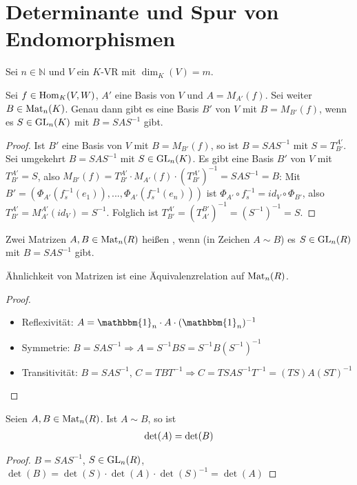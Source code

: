 \section{Determinante und Spur von Endomorphismen}

Sei $n\in \mathbb N$ und $V$ ein $K$-VR mit $\dim_K(V)=m$.

\begin{proposition}
	Sei $f\in \operatorname{Hom}_K(V,W)$, $A'$ eine Basis von $V$ und $A=M_{A'}(f)$. Sei weiter $B\in \operatorname{Mat}_n(K)$. Genau 
	dann gibt es eine Basis $B'$ von $V$ mit $B=M_{B'}(f)$, wenn es $S\in \operatorname{GL}_n(K)$ mit $B=SAS^{-1}$ gibt.
\end{proposition}
\begin{proof}
	Ist $B'$ eine Basis von $V$ mit $B=M_{B'}(f)$, so ist $B=SAS^{-1}$ mit $S=T^{A'}_{B'}$. Sei umgekehrt $B=SAS^{-1}$ mit 
	$S\in \operatorname{GL}_n(K)$. Es gibt eine Basis $B'$ von $V$ mit $T^{A'}_{B'}=S$, also $M_{B'}(f)=T^{A'}_{B'}\cdot M_{A'}(f)\cdot (
	T^{A'}_{B'})^{-1}=SAS^{-1}=B$: Mit $B'=(\Phi_{A'}(f_s^{-1}(e_1)),...,\Phi_{A'}(f_s^{-1}(e_n)))$ ist $\Phi_{A'}\circ f_s^{-1}=
	id_V\circ \Phi_{B'}$, also $T^{A'}_{B'}=M_{A'}^{A'}(id_V)=S^{-1}$. Folglich ist $T^{A'}_{B'}=(T_{A'}^{B'})^{-1}=(S^{-1})^{-1}
	=S$.
\end{proof}

\begin{definition}[Ähnlichkeit]
	Zwei Matrizen $A,B\in \operatorname{Mat}_n(R)$ heißen , wenn (in Zeichen $A\sim B$) es 
	$S\in \operatorname{GL}_n(R)$ mit $B=SAS^{-1}$ gibt.
\end{definition}

\begin{proposition}
	Ähnlichkeit von Matrizen ist eine Äquivalenzrelation auf $\operatorname{Mat}_n(R)$.
\end{proposition}
\begin{proof}
	\begin{itemize}
		\item Reflexivität: $A=\mathbbm{1}_n\cdot A \cdot (\mathbbm{1}_n)^{-1}$
		\item Symmetrie: $B=SAS^{-1}\Rightarrow A=S^{-1}BS=S^{-1}B(S^{-1})^{-1}$
		\item Transitivität: $B=SAS^{-1}$, $C=TBT^{-1}\Rightarrow C=TSAS^{-1}T^{-1}=(TS)A(ST)^{-1}$
	\end{itemize}
\end{proof}

\begin{proposition}
	Seien $A,B\in \operatorname{Mat}_n(R)$. Ist $A\sim B$, so ist
	\begin{align}
		\det(A)=\det(B)\notag
	\end{align}
\end{proposition}
\begin{proof}
	$B=SAS^{-1}$, $S\in \operatorname{GL}_n(R)$, $\det(B)=\det(S)\cdot \det(A)\cdot \det(S)^{-1}=\det(A)$
\end{proof}

